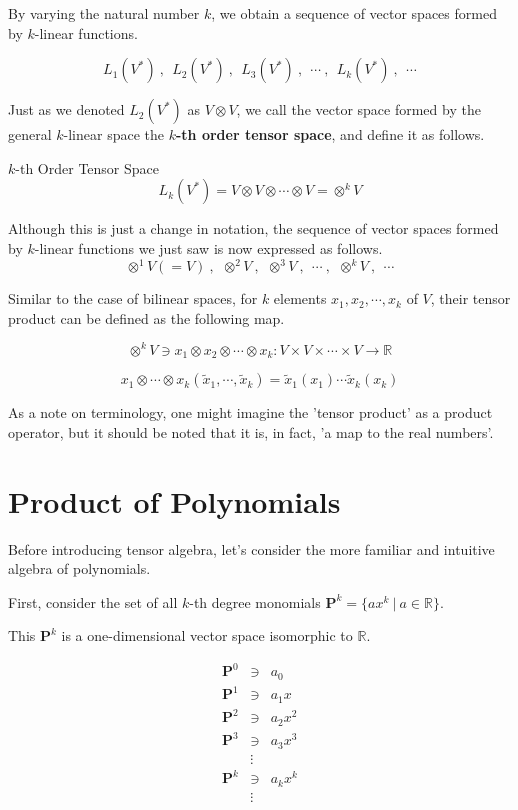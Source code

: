 \documentclass[uplatex,a4j,12pt,dvipdfmx]{jsarticle}
\begin{document}
By varying the natural number $k$, we obtain a sequence of vector spaces formed by $k$-linear functions.

$$
	L_{1}(V^{*}) \ , \ \ L_{2}(V^{*}) \ , \ \ L_{3}(V^{*}) \ , \ \ \cdots \ , \ \ L_{k}(V^{*}) \ , \ \ \cdots
$$

Just as we denoted $L_{2}(V^{*})$ as $V \otimes V$, we call the vector space formed by the general $k$-linear space the
\textbf{$k$-th order tensor space}, and define it as follows.

\begin{itembox}[l]{$k$-th Order Tensor Space}
	$$L_{k}(V^{*}) = V \otimes V \otimes \cdots \otimes V = \otimes^{k} V$$
\end{itembox}

Although this is just a change in notation, the sequence of vector spaces formed by $k$-linear functions we just saw is now expressed as follows.
$$
	\otimes^{1} V (= V) \ , \ \ \otimes^{2} V \ , \ \ \otimes^{3} V \ , \ \ \cdots \ , \ \ \otimes^{k} V \ , \ \ \cdots
$$

Similar to the case of bilinear spaces,
for $k$ elements $x_{1}, x_{2} , \cdots , x_{k}$ of $V$, their tensor product can be defined as the following map.

$$ \otimes^{k} V \ni x_{1} \otimes x_{2} \otimes \cdots \otimes x_{k}: V \times V \times \cdots \times V \to \mathbb{R}$$

$$
	x_{1} \otimes \cdots \otimes x_{k} ( \tilde{x}_{1} , \cdots, \tilde{x}_{k})
	=
	\tilde{x}_{1} (x_{1}) \cdots \tilde{x}_{k} (x_{k})
$$

As a note on terminology,
one might imagine the 'tensor product' as a product operator, but it should be noted that it is, in fact, 'a map to the real numbers'.

\section{Product of Polynomials}

Before introducing tensor algebra, let's consider the more familiar and intuitive algebra of polynomials.

First, consider the set of all $k$-th degree monomials $\mathbf{P}^{k} = \{ ax^{k} \ | \ a \in \mathbb{R} \}$.

This $\mathbf{P}^{k}$ is a one-dimensional vector space isomorphic to $\mathbb{R}$.

\[
	\begin{array}{rcl}
		\mathbf{P}^{0} & \ni    & a_{0}       \\
		\mathbf{P}^{1} & \ni    & a_{1} x     \\
		\mathbf{P}^{2} & \ni    & a_{2} x^{2} \\
		\mathbf{P}^{3} & \ni    & a_{3} x^{3} \\
		               & \vdots &             \\
		\mathbf{P}^{k} & \ni    & a_{k} x^{k} \\
		               & \vdots &             \\
	\end{array}
\]
\end{document}

